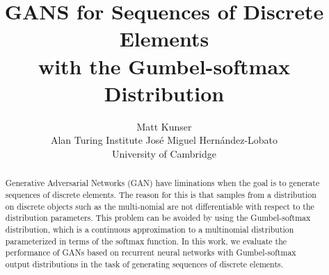 \documentclass{article}
\title{GANS for Sequences of Discrete Elements \\with the Gumbel-softmax Distribution}
\author{
    Matt Kunser\\
    Alan Turing Institute
    \And
    Jos\'e Miguel Hern\'andez-Lobato\\
    University of Cambridge
}
\begin{document}

\maketitle

\begin{abstract}
Generative Adversarial Networks (GAN) have liminations when the goal is to
generate sequences of discrete elements. The reason for this is that
samples from a distribution on discrete objects such as the multi-nomial are
not differentiable with respect to the distribution parameters. This problem
can be avoided by using the Gumbel-softmax distribution, which is a continuous
approximation to a multinomial distribution parameterized in terms of the
softmax function. In this work, we evaluate the performance of GANs based on
recurrent neural networks with Gumbel-softmax output distributions in the task
of generating sequences of discrete elements.
\end{abstract}








\end{document}
